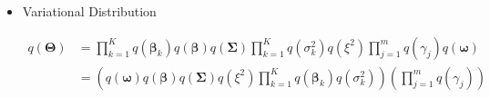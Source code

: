 \begin{appendix}
\begin{itemize}
\begin{equation}
\begin{split}
\log p(\bm{\Theta} , \bm{y},\bm{X})
&= \log p(\bm{y}\mid\bm{X},\bm{\gamma},\bm{\zeta},\bm{\sigma}^2) + \sum_{j=1}^{m}\log p(\gamma_j\mid\bm{\omega}) + \log p(\bm{\omega}) \\
&\quad + \sum_{k=1}^{K}\log p(\bm{\beta}_k\mid\bm{\beta},\bm{\Sigma}) + \log p(\bm{\beta}) + \log p(\bm{\Sigma}) + \sum_{k=1}^{K}\log p(\bm{\sigma}_k^2 \mid \xi^2) + \log p(\xi^2) \\
&=\sum_{j=1}^{m}\sum_{k=1}^{K}\Bigg[[\gamma_j=k]\Bigg[
-\tfrac{n_j}{2}\log(2\pi)-\tfrac{n_j}{2}\log\sigma^2_{k}
-\tfrac{1}{2\sigma^2_{j}}\left(\bm{y}_{j}-\bm{X}_{j}\bm{\beta}_{k}\right)^\top\left(\bm{y}_{j}-\bm{X}_{j}\bm{\beta}_{k}\right)
\Bigg]\Bigg] \\
&\quad + \sum_{j=1}^{m}\sum_{k=1}^{K}\left[[\gamma_j=k]\log\omega_k\right] 
+ \left[\log \frac{\Gamma\left( \sum_{k=1}^{K} \alpha_{0k} \right)}{\prod_{k=1}^{K} \Gamma(\alpha_{0k})} + \sum_{k=1}^{K}\left[(\alpha_{0k}-1)\log\omega_k\right] \right] \\
&\quad + \sum_{k=1}^{K}\Bigg[
-\tfrac{p}{2}\log(2\pi)-\tfrac{1}{2}\log|\bm{\Sigma}|
-\tfrac{1}{2}(\bm{\beta}_k-\bm{\beta})^{\top}\bm{\Sigma}^{-1}(\bm{\beta}_k-\bm{\beta})
\Bigg] \\
&\quad +\Bigg[
-\tfrac{p}{2}\log(2\pi)-\tfrac{1}{2}\log|\bm{\Lambda}_0|
-\tfrac{1}{2}(\bm{\beta}-\bm{\mu}_0)^{\top}\bm{\Lambda}_0^{-1}(\bm{\beta}-\bm{\mu}_0)
\Bigg] \\
&\quad + \Bigg[
\tfrac{n_0}{2}\log|\bm{S}_0|-\tfrac{n_0p}{2}\log 2-\log\Gamma_p\!\!\left(\tfrac{n_0}{2}\right)
-\tfrac{n_0+p+1}{2}\log|\bm{\Sigma}|
-\tfrac{1}{2}\operatorname{tr}\!\!\left(\bm{S}_0\bm{\Sigma}^{-1}\right)
\Bigg] \\
&\quad + \sum_{k=1}^{K}\Bigg[
-\left(\tfrac{\nu_0}{2}+1\right)\log\sigma_k^2
-\tfrac{\nu_0\xi^2}{2\sigma_k^2}
+\tfrac{\nu_0}{2}\log\!\left(\tfrac{\nu_0\xi^2}{2}\right)
-\log\Gamma\left(\tfrac{\nu_0}{2}\right)
\Bigg] \\
&\quad + \Bigg[
(a_0-1)\log\xi^2 - b_0\xi^2 + a_0\log b_0 - \log\Gamma(a_0)
\Bigg].
\end{split}
\end{equation}

\item Variational Distribution 

\begin{equation}
\begin{split}
q(\bm{\Theta})&=\prod_{k=1}^{K}q(\bm{\beta}_k)q(\bm{\beta})q(\bm{\Sigma})\prod_{k=1}^{K}q(\sigma_k^2)q(\xi^2)\prod_{j=1}^{m}q(\gamma_j)q(\bm{\omega})\\
&= \left(q(\bm{\omega})q(\bm{\beta})q(\bm{\Sigma})q(\xi^2)\prod_{k=1}^{K}q(\bm{\beta}_k)q(\sigma_k^2)\right)\left(\prod_{j=1}^{m}q(\gamma_j)\right)
\end{split}
\end{equation}


\end{itemize}
\end{appendix}

